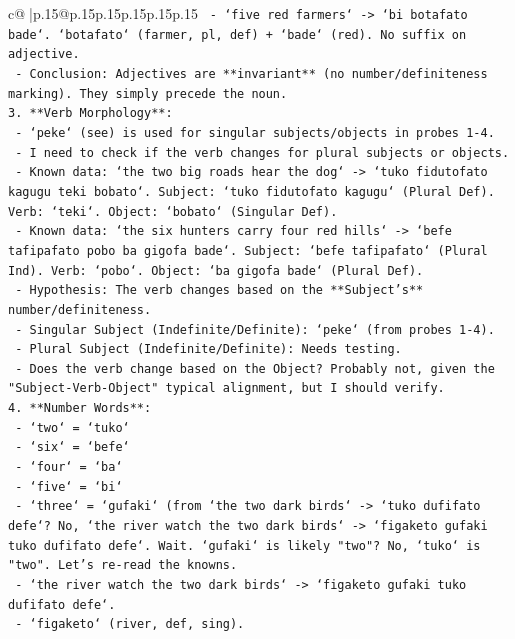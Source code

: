\documentclass{article}
\begin{document}
{\begin{supertabular}{c@{$\;$}|p{.15\linewidth}@{}p{.15\linewidth}p{.15\linewidth}p{.15\linewidth}p{.15\linewidth}p{.15\linewidth}}
{{{\texttt{   {-} `five red farmers` {-}> `bi botafato bade`. `botafato` (farmer, pl, def) + `bade` (red). No suffix on adjective.} \\
\texttt{   {-} Conclusion: Adjectives are **invariant** (no number/definiteness marking). They simply precede the noun.} \\
\texttt{3. **Verb Morphology**:} \\
\texttt{   {-} `peke` (see) is used for singular subjects/objects in probes 1{-}4.} \\
\texttt{   {-} I need to check if the verb changes for plural subjects or objects.} \\
\texttt{   {-} Known data: `the two big roads hear the dog` {-}> `tuko fidutofato kagugu teki bobato`. Subject: `tuko fidutofato kagugu` (Plural Def). Verb: `teki`. Object: `bobato` (Singular Def).} \\
\texttt{   {-} Known data: `the six hunters carry four red hills` {-}> `befe tafipafato pobo ba gigofa bade`. Subject: `befe tafipafato` (Plural Ind). Verb: `pobo`. Object: `ba gigofa bade` (Plural Def).} \\
\texttt{   {-} Hypothesis: The verb changes based on the **Subject's** number/definiteness.} \\
\texttt{     {-} Singular Subject (Indefinite/Definite): `peke` (from probes 1{-}4).} \\
\texttt{     {-} Plural Subject (Indefinite/Definite): Needs testing.} \\
\texttt{     {-} Does the verb change based on the Object? Probably not, given the "Subject{-}Verb{-}Object" typical alignment, but I should verify.} \\
\texttt{4. **Number Words**:} \\
\texttt{   {-} `two` = `tuko`} \\
\texttt{   {-} `six` = `befe`} \\
\texttt{   {-} `four` = `ba`} \\
\texttt{   {-} `five` = `bi`} \\
\texttt{   {-} `three` = `gufaki` (from `the two dark birds` {-}> `tuko dufifato defe`? No, `the river watch the two dark birds` {-}> `figaketo gufaki tuko dufifato defe`. Wait. `gufaki` is likely "two"? No, `tuko` is "two". Let's re{-}read the knowns.} \\
\texttt{   {-} `the river watch the two dark birds` {-}> `figaketo gufaki tuko dufifato defe`.} \\
\texttt{     {-} `figaketo` (river, def, sing).} \\
}}}
\end{supertabular}}
\end{document}
